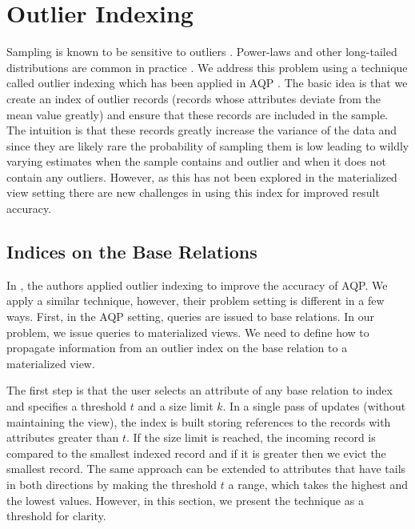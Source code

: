 \vspace{-.5em}
\section{Outlier Indexing}\label{outlier}
Sampling is known to be sensitive to outliers \cite{clauset2009power, chaudhuri2001overcoming}.
Power-laws and other long-tailed distributions are common in practice \cite{clauset2009power}.
We address this problem using a technique called outlier indexing which has been applied in AQP \cite{chaudhuri2001overcoming}.
The basic idea is that we create an index of outlier records (records whose attributes deviate from the mean value greatly) and ensure that these records are included in the sample.
The intuition is that these records greatly increase the variance of the data and since they are likely rare the probability of sampling them is low leading to wildly varying estimates when the sample contains and outlier and when it does not contain any outliers.  
However, as this has not been explored in the materialized view setting there are new challenges in using this index for improved result accuracy.

\subsection{Indices on the Base Relations}
In \cite{chaudhuri2001overcoming}, the authors applied outlier indexing to improve the accuracy of AQP.
We apply a similar technique, however, their problem setting is different in a few ways.
First, in the AQP setting, queries are issued to base relations.
In our problem, we issue queries to materialized views.
We need to define how to propagate information from an outlier index on the base relation to a materialized view.

The first step is that the user selects an attribute of any base relation to index and specifies a threshold $t$ and a size limit $k$.
In a single pass of updates (without maintaining the view), the index is built storing references to the records with attributes greater than $t$.
If the size limit is reached, the incoming record is compared to the smallest indexed record and if it is greater then we evict the smallest record.
The same approach can be extended to attributes that have tails in both directions by making the threshold $t$ a range, which takes the highest and the lowest values.
However, in this section, we present the technique as a threshold for clarity.

